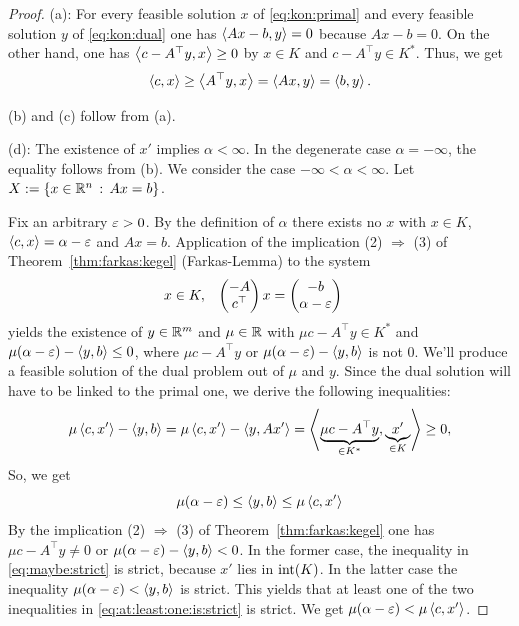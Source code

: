 \begin{proof}	
	(a): For every feasible solution $x$ of \eqref{eq:kon:primal} and every feasible solution $y$ of \eqref{eq:kon:dual} one has $\left\langle A x -b  , y \right\rangle = 0$ because $A x -b  = 0 $. On the other hand, one has $\left\langle c - A^\top y , x \right\rangle \ge 0$  by $x\in K$ and $c - A^\top y  \in K^\ast$. Thus, we get
	\[
		\left\langle c , x \right\rangle \ge \left\langle A^\top y , x \right\rangle = \left\langle A x  , y \right\rangle = \left\langle b , y \right\rangle.
	\]
	
	(b) and (c) follow from (a).
	
	(d):  The existence of $x'$ implies $\alpha < \infty$. In the degenerate case $\alpha = -\infty$, the equality follows from (b). We consider the case $-\infty < \alpha < \infty$. Let $X := \left\{ x \in \mathbb{R}^n \,:\, A x = b \right\}$.
	
	
	Fix an arbitrary ${\operatorname{\varepsilon}}> 0$. By the definition of $\alpha$ there exists no $x$ with $x \in K$, $\left\langle c , x \right\rangle = \alpha - {\operatorname{\varepsilon}}$ and $A x  = b$. Application of the implication (2) $\Rightarrow$ (3) of  Theorem~\ref{thm:farkas:kegel} (Farkas-Lemma) to the system
	\begin{align*}
		x & \in K,
		&
		\begin{pmatrix}
			-A 
			\\ 
			c^\top
		\end{pmatrix}
			x
		& = \begin{pmatrix}
			-b
			\\
			\alpha - {\operatorname{\varepsilon}}
		\end{pmatrix}
	\end{align*}
	yields the existence of $y \in \mathbb{R}^m$ and $\mu \in \mathbb{R}$ with $\mu c - A^\top y \in K^\ast$ and $\mu( \alpha - {\operatorname{\varepsilon}}) - \left\langle y , b \right\rangle \le 0$, where $\mu c - A^\top y$ or $\mu(\alpha - {\operatorname{\varepsilon}}) - \left\langle y , b \right\rangle$ is not $0$. We'll produce a feasible solution of the dual problem out of  $\mu$ and $y$. Since the dual solution will have to be linked to the primal one, we derive the following inequalities:
	\begin{equation}
		\label{eq:maybe:strict}
		\mu \left\langle c , x' \right\rangle - \left\langle y , b \right\rangle = \mu \left\langle c , x' \right\rangle - \left\langle y , A x' \right\rangle = \left\langle \underbrace{\mu c - A^\top y}_{\in K^\ast} , \underbrace{x'}_{\in K} \right\rangle \ge 0,
	\end{equation}
	So, we get
	\begin{equation}
		\label{eq:at:least:one:is:strict}
		\mu(\alpha - {\operatorname{\varepsilon}}) \le \left\langle y , b \right\rangle \le \mu \left\langle c , x' \right\rangle 
	\end{equation}
	By the implication (2) $\Rightarrow$ (3) of Theorem~\ref{thm:farkas:kegel} one has $\mu c - A^\top y \ne 0$ or $\mu ( \alpha - {\operatorname{\varepsilon}}) - \left\langle y , b \right\rangle < 0$. In the former case, the inequality in \eqref{eq:maybe:strict} is strict, because $x'$ lies in $\operatorname{int}(K)$. In the latter case the inequality $\mu (\alpha - {\operatorname{\varepsilon}}) < \left\langle y , b \right\rangle$ is strict. This yields that at least one of the two inequalities in \eqref{eq:at:least:one:is:strict} is strict. We get $\mu (\alpha - {\operatorname{\varepsilon}}) < \mu \left\langle c , x' \right\rangle$. 


\end{proof}
